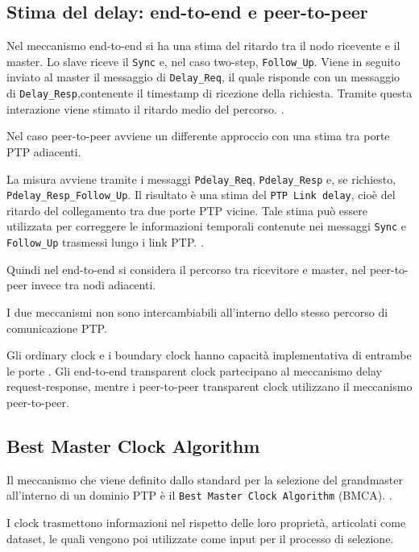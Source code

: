 \subsection{Stima del delay: end-to-end e peer-to-peer}


Nel meccanismo end-to-end si ha una stima del ritardo tra il nodo ricevente e 
il master. Lo slave riceve il \texttt{Sync} e, nel caso two-step, \texttt{Follow\_Up}.
Viene in seguito inviato al master il messaggio di \texttt{Delay\_Req}, il quale risponde
con un messaggio di \texttt{Delay\_Resp},contenente il timestamp di ricezione della richiesta. 
Tramite questa interazione viene stimato il ritardo medio del percorso.
\cite{IEEEStandardPrecision2020}.

Nel caso peer-to-peer avviene un differente approccio con una stima tra porte PTP adiacenti.

\begin{sloppypar}
  La misura avviene tramite i messaggi \texttt{Pdelay\_Req}, \texttt{Pdelay\_Resp} 
  e, se richiesto, \texttt{Pdelay\_Resp\_Follow\_Up}.
  Il risultato è una stima del \texttt{PTP Link delay}, cioè del ritardo del collegamento
  tra due porte PTP vicine. Tale stima può essere utilizzata per correggere le
  informazioni temporali contenute nei messaggi \texttt{Sync} e \texttt{Follow\_Up}
  trasmessi lungo i link PTP. \cite{IEEEStandardPrecision2020}.
\end{sloppypar}

Quindi nel end-to-end si considera il percorso tra ricevitore e master, nel peer-to-peer
invece tra nodi adiacenti.

I due meccanismi non sono intercambiabili all'interno dello stesso percorso di
comunicazione PTP.

Gli ordinary clock e i boundary clock hanno capacità implementativa di entrambe le porte
. Gli end-to-end transparent clock partecipano al
meccanismo delay request-response, mentre i peer-to-peer transparent clock utilizzano
il meccanismo peer-to-peer.

\subsection{Best Master Clock Algorithm}
Il meccanismo che viene definito dallo standard per la selezione del grandmaster all'interno 
di un dominio PTP è il \texttt{Best Master Clock Algorithm} (BMCA).
\cite{IEEEStandardPrecision2020}.

I clock trasmettono informazioni nel rispetto delle loro proprietà, articolati come
dataset, le quali vengono poi utilizzate come input per il processo di selezione.

